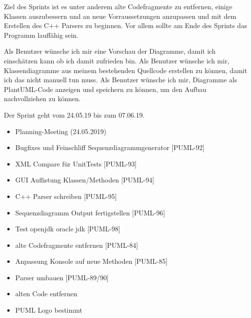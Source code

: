 Ziel des Sprints ist es unter anderem alte Codefragmente zu entfernen, einige Klassen auszubessern und an neue Vorraussetzungen anzupassen und mit dem Erstellen des C++ Parsers zu beginnen. Vor allem sollte am Ende des Sprints das Programm lauffähig sein.
\nsecend

Als Benutzer wünsche ich mir eine Vorschau der Diagramme, damit ich einschätzen kann ob ich
damit zufrieden bin.
\nsecend
{}
Als Benutzer wünsche ich mir, Klassendiagramme aus meinem bestehenden Quellcode erstellen zu können, damit ich das nicht manuell tun muss.
\nsecend
{}
Als Benutzer wünsche ich mir, Diagramme als PlantUML-Code anzeigen und speichern zu können, um den Aufbau nachvollziehen zu können.
\nsecend
\nsecend

Der Sprint geht vom 24.05.19 bis zum 07.06.19.
\nsecend

\begin{itemize}
\item Planning-Meeting (24.05.2019)
\end{itemize}
\nsecend

\begin{itemize}
\item Bugfixes und Feinschliff Sequenzdiagrammgenerator [PUML-92]
\item XML Compare für UnitTests [PUML-93]
\item GUI Auflistung Klassen/Methoden [PUML-94]
\item C++ Parser schreiben [PUML-95]
\item Sequenzdiagramm Output fertigstellen [PUML-96]
\item Test openjdk oracle jdk [PUML-98]
\item alte Codefragmente entfernen [PUML-84]
\item Anpassung Konsole auf neue Methoden [PUML-85]
\item Parser umbauen [PUML-89/90]
\item alten Code entfernen
\item PUML Logo bestimmt
\end{itemize}
\nsecend

